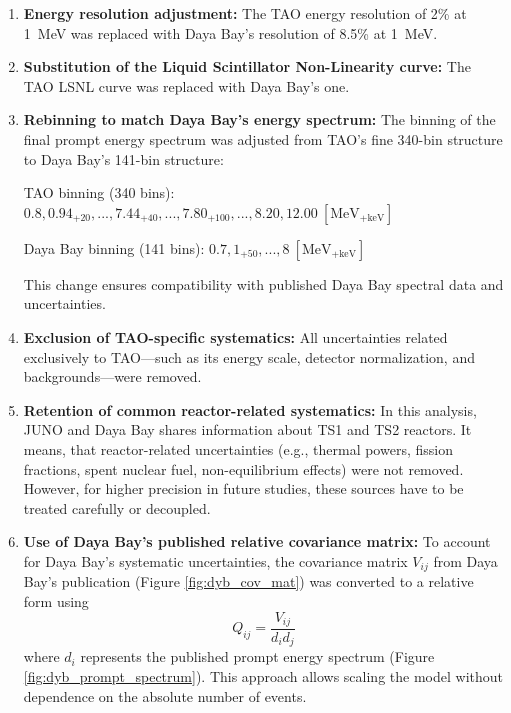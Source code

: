 \begin{enumerate}
  \item \textbf{Energy resolution adjustment:}  The TAO energy resolution of 2\% at
  1~MeV was replaced with Daya Bay’s resolution of 8.5\% at 1~MeV.

  \item \textbf{Substitution of the Liquid Scintillator Non-Linearity curve:}  The TAO LSNL curve
    was replaced with Daya Bay’s one.

  \item \textbf{Rebinning to match Daya Bay's energy spectrum:}  The binning of the final prompt
    energy spectrum was adjusted from TAO’s fine 340-bin structure to Daya Bay’s 141-bin structure:

    TAO binning (340 bins): \hfill $0.8, 0.94_{+20}, ..., 7.44_{+40}, ..., 7.80_{+100}, ..., 8.20, 12.00 \ [\text{MeV}_\text{+keV}]$

    Daya Bay binning (141 bins): \hfill $0.7, 1_{+50}, ..., 8 \ [\text{MeV}_\text{+keV}]$

    This change ensures compatibility with published Daya Bay spectral data and uncertainties.

  \item \textbf{Exclusion of TAO-specific systematics:}  All uncertainties related exclusively to
    TAO—such as its energy scale, detector normalization, and backgrounds—were removed.

  \item \textbf{Retention of common reactor-related systematics:} In this analysis, JUNO and Daya
    Bay shares information about TS1 and TS2 reactors. It means, that reactor-related uncertainties
    (e.g., thermal powers, fission fractions, spent nuclear fuel, non-equilibrium effects) were not
    removed. However, for higher precision in future studies, these sources have to be treated
    carefully or decoupled.

  \item \textbf{Use of Daya Bay’s published relative covariance matrix:} To
    account for Daya Bay's systematic uncertainties, the covariance matrix
    $V_{ij}$ from Daya Bay’s publication (Figure \ref{fig:dyb_cov_mat})
    \cite{DayaBay:2021dqj} was converted to a relative form using
    \begin{equation}
      Q_{ij} = \frac{V_{ij}}{d_i d_j}
    \end{equation}
    where $d_i$ represents the published prompt energy spectrum (Figure
    \ref{fig:dyb_prompt_spectrum}). This approach allows scaling the model without dependence on the
    absolute number of events.


\end{enumerate}

